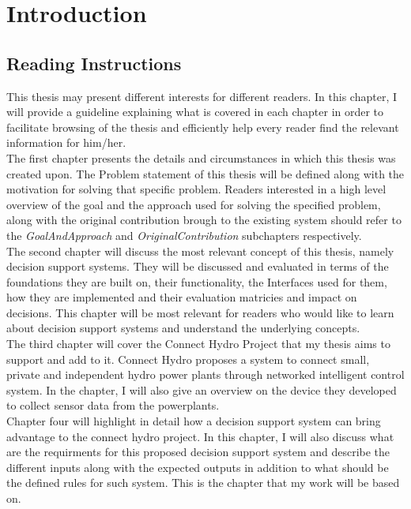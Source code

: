 \chapter{Introduction}
\label{ChapterOne}
\section{Reading Instructions}
\label{sec:Reading Instructions}
\indent This thesis may present different interests for different readers. In this chapter, I will provide a guideline explaining what is covered in each chapter in order to facilitate browsing of the thesis and efficiently help every reader find the relevant information for him/her. \\
\indent The first chapter presents the details and circumstances in which this thesis was created upon. The Problem statement of this thesis will be defined along with the motivation for solving that specific problem. Readers interested in a high level overview of the goal and the approach used for solving the specified problem, along with the original contribution brough to the existing system should refer to the \textit{GoalAndApproach} and \textit{OriginalContribution} subchapters respectively.\\
\indent The second chapter will discuss the most relevant concept of this thesis, namely decision support systems. They will be discussed and evaluated in terms of the foundations they are built on, their functionality, the Interfaces used for them, how they are implemented and their evaluation matricies and impact on decisions. This chapter will be most relevant for readers who would like to learn about decision support systems and understand the underlying concepts.\\
\indent The third chapter will cover the Connect Hydro Project that my thesis aims to support and add to it. Connect Hydro proposes a system to connect small, private and independent hydro power plants through networked intelligent control system. In the chapter, I will also give an overview on the device they developed to collect sensor data from the powerplants.\\
\indent Chapter four will highlight in detail how a decision support system can bring advantage to the connect hydro project. In this chapter, I will also discuss what are the requirments for this proposed decision support system and describe the different inputs along with the expected outputs in addition to what should be the defined rules for such system. This is the chapter that my work will be based on.\\
